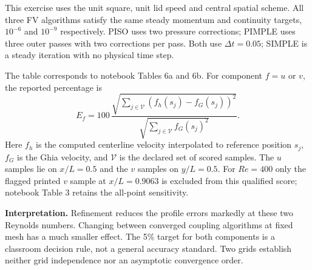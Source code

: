 This exercise uses the unit square, unit lid speed and central spatial scheme.
All three FV algorithms satisfy the same steady momentum and continuity targets,
$10^{-6}$ and $10^{-9}$ respectively. PISO uses two pressure corrections; PIMPLE
uses three outer passes with two corrections per pass. Both use
$\Delta t=0.05$; SIMPLE is a steady iteration with no physical time step.



The table corresponds to notebook Tables 6a and 6b. For component $f=u$ or $v$,
the reported percentage is
\[
 E_f=100\,\frac{\sqrt{\sum_{j\in\mathcal V}(f_h(s_j)-f_G(s_j))^2}}
 {\sqrt{\sum_{j\in\mathcal V} f_G(s_j)^2}}.
\]
Here $f_h$ is the computed centerline velocity interpolated to reference position
$s_j$, $f_G$ is the Ghia velocity, and $\mathcal V$ is the declared set of scored
samples. The $u$ samples lie on $x/L=0.5$ and the $v$ samples on $y/L=0.5$.
For $Re=400$ only the flagged printed $v$ sample at $x/L=0.9063$ is excluded
from this qualified score; notebook Table 3 retains the all-point sensitivity.

\textbf{Interpretation.} Refinement reduces the profile errors markedly at these
two Reynolds numbers. Changing between converged coupling algorithms at fixed
mesh has a much smaller effect. The 5\% target for both components is a classroom
decision rule, not a general accuracy standard. Two grids establish neither
grid independence nor an asymptotic convergence order.

